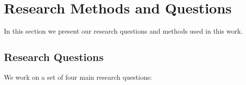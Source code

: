 \section{Research Methods and Questions}
In this section we present our research questions and methods used in this work. 

\subsection{Research Questions}
We work on a set of four main research questions:

